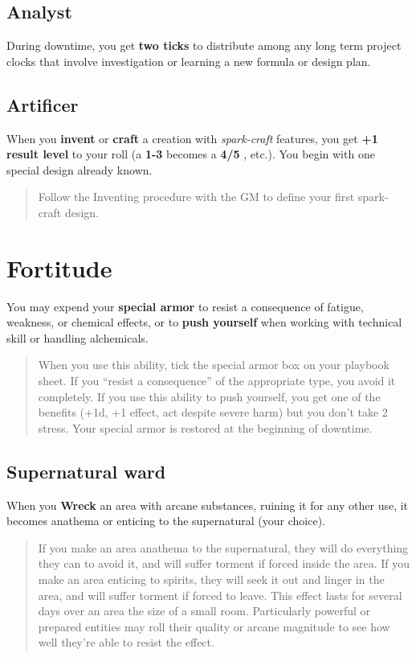 \documentclass[11pt,fleqn,a5paper]{book}
\newcommand{\gameterm}[1]{\textbf{#1}}
\begin{document}
\subsection{Analyst}

During downtime, you get \textbf{two ticks} to distribute among any long term project clocks that involve investigation or learning a new formula or design plan.

\subsection{Artificer}

When you \textbf{invent} or \textbf{craft} a creation with \emph{spark-craft} features, you get \textbf{+1 result level} to your roll (a \gameterm{1-3}  becomes a \gameterm{4/5} , etc.). You begin with one special design already known.

\begin{quote}
	Follow the Inventing procedure with the GM to define your first spark-craft design.
\end{quote} 

\section{Fortitude}

You may expend your \textbf{special armor} to resist a consequence of fatigue, weakness, or chemical effects, or to \textbf{push yourself} when working with technical skill or handling alchemicals.

\begin{quote}
	When you use this ability, tick the special armor box on your playbook sheet. If you “resist a consequence” of the appropriate type, you avoid it completely. If you use this ability to push yourself, you get one of the benefits (+1d, +1 effect, act despite severe harm) but you don’t take 2 stress. Your special armor is restored at the beginning of downtime.
\end{quote} 

\subsection{Supernatural ward}

When you \gameterm{Wreck}  an area with arcane substances, ruining it for any other use, it becomes anathema or enticing to the supernatural (your choice).

\begin{quote}
	If you make an area anathema to the supernatural, they will do everything they can to avoid it, and will suffer torment if forced inside the area. If you make an area enticing to spirits, they will seek it out and linger in the area, and will suffer torment if forced to leave. This effect lasts for several days over an area the size of a small room. Particularly powerful or prepared entities may roll their quality or arcane magnitude to see how well they’re able to resist the effect.
\end{quote} 
\end{document}
